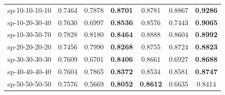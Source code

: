 \begin{table}[!ht]
{\begin{tabular}{lcccccc}
    sp-10-10-10-10 & 0.7464 & 0.7878 & \textbf{0.8701} & 0.8781 & 0.8867 & \textbf{0.9286} \\
    sp-10-20-30-40                 & 0.7630                           & 0.6997                           & \textbf{0.8536} & 0.8576                           & 0.7443                           & \textbf{0.9065} \\
    sp-10-30-50-70  & 0.7828 & 0.8180 & \textbf{0.8464} & 0.8888 & 0.8604 & \textbf{0.8992} \\
    sp-20-20-20-20 & 0.7456 & 0.7990 & \textbf{0.8268} & 0.8755 & 0.8724 & \textbf{0.8823} \\
    sp-30-30-30-30 & 0.7609 & 0.6701 & \textbf{0.8406} & 0.8661 & 0.6927 & \textbf{0.8688} \\
    sp-40-40-40-40 & 0.7604 & 0.7865 & \textbf{0.8372} & 0.8534 & 0.8581 & \textbf{0.8747} \\
    sp-50-50-50-50 & 0.7576 & 0.5669 & \textbf{0.8052} & \textbf{0.8612} & 0.6635 & 0.8414 \\
    \hline
    \end{tabular}%
        }
    \end{table}
    
